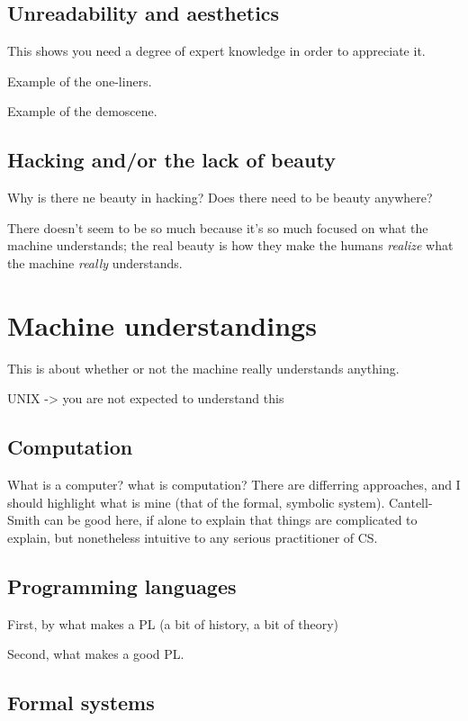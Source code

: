 \documentclass{article}
\begin{document}
\subsection{Unreadability and aesthetics}

This shows you need a degree of expert knowledge in order to appreciate it.

Example of the one-liners.

Example of the demoscene.

\subsection{Hacking and/or the lack of beauty}

Why is there ne beauty in hacking? Does there need to be beauty anywhere?

There doesn't seem to be so much because it's so much focused on what the machine understands; the real beauty is how they make the humans \emph{realize} what the machine \emph{really} understands.

\section{Machine understandings}

This is about whether or not the machine really understands anything.

UNIX -> you are not expected to understand this

\subsection{Computation}

What is a computer? what is computation? There are differring approaches, and I should highlight what is mine (that of the formal, symbolic system). Cantell-Smith can be good here, if alone to explain that things are complicated to explain, but nonetheless intuitive to any serious practitioner of CS.

\subsection{Programming languages}

First, by what makes a PL (a bit of history, a bit of theory)

Second, what makes a good PL.

\subsection{Formal systems}
\end{document}
